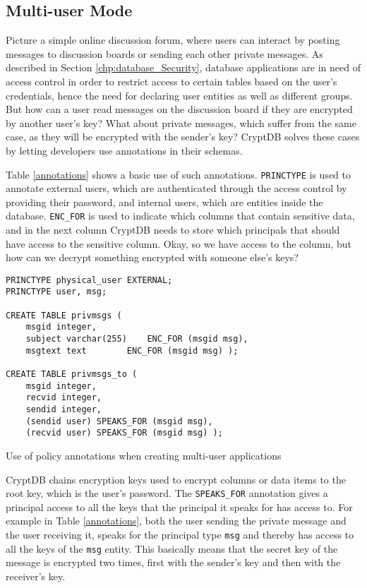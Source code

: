 \subsection{Multi-user Mode}
Picture a simple online discussion forum, where users can interact by posting messages to discussion boards or sending each other private messages. As described in Section \ref{chp:database_Security}, database applications are in need of access control in order to restrict access to certain tables based on the user's credentials, hence the need for declaring user entities as well as different groups. But how can a user read messages on the discussion board if they are encrypted by another user's key? What about private messages, which suffer from the same case, as they will be encrypted with the sender's key? CryptDB solves these cases by letting developers use annotations in their schemas.



Table \ref{annotations} shows a basic use of such annotations. \verb!PRINCTYPE! is used to annotate external users, which are authenticated through the access control by providing their password, and internal users, which are entities inside the database. \verb!ENC_FOR! is used to indicate which columns that contain sensitive data, and in the next column CryptDB needs to store which principals that should have access to the sensitive column. Okay, so we have access to the column, but how can we decrypt something encrypted with someone else's keys?

\begin{table}
\begin{Verbatim}[frame=single]
PRINCTYPE physical_user EXTERNAL;
PRINCTYPE user, msg;

CREATE TABLE privmsgs (
	msgid integer,
	subject varchar(255)	ENC_FOR (msgid msg),
	msgtext text		ENC_FOR (msgid msg) );

CREATE TABLE privmsgs_to (
	msgid integer,
	recvid integer,
	sendid integer,
	(sendid user) SPEAKS_FOR (msgid msg),
	(recvid user) SPEAKS_FOR (msgid msg) ); 
\end{Verbatim}
\caption{Use of policy annotations when creating multi-user applications}
\label{annotations}
\end{table}

CryptDB chains encryption keys used to encrypt columns or data items to the root key, which is the user's password. The \verb!SPEAKS_FOR! annotation gives a principal access to all the keys that the principal it speaks for has access to. For example in Table \ref{annotations}, both the user sending the private message and the user receiving it, speaks for the principal type \verb!msg! and thereby has access to all the keys of the \verb!msg! entity. This basically means that the secret key of the message is encrypted two times, first with the sender's key and then with the receiver's key.

